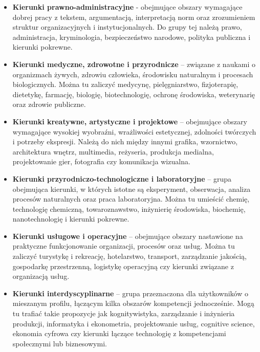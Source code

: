 \documentclass[12pt,a4paper,oneside]{article}
\begin{document}
\begin{itemize}[leftmargin=1.2cm]
    \item \textbf{Kierunki prawno-administracyjne} - obejmujące obszary wymagające dobrej pracy z tekstem, argumentacją, interpretacją norm oraz zrozumieniem struktur organizacyjnych i instytucjonalnych. Do grupy tej należą prawo, administracja, kryminologia, bezpieczeństwo narodowe, polityka publiczna i kierunki pokrewne.

    \item \textbf{Kierunki medyczne, zdrowotne i przyrodnicze} – związane z naukami o organizmach żywych, zdrowiu człowieka, środowisku naturalnym i procesach biologicznych. Można tu zaliczyć medycynę, pielęgniarstwo, fizjoterapię, dietetykę, farmację, biologię, biotechnologię, ochronę środowiska, weterynarię oraz zdrowie publiczne.

    \item \textbf{Kierunki kreatywne, artystyczne i projektowe} – obejmujące obszary wymagające wysokiej wyobraźni, wrażliwości estetycznej, zdolności twórczych i potrzeby ekspresji. Należą do nich między innymi grafika, wzornictwo, architektura wnętrz, multimedia, reżyseria, produkcja medialna, projektowanie gier, fotografia czy komunikacja wizualna.

    \item \textbf{Kierunki przyrodniczo-technologiczne i laboratoryjne} – grupa obejmująca kierunki, w których istotne są eksperyment, obserwacja, analiza procesów naturalnych oraz praca laboratoryjna. Można tu umieścić chemię, technologię chemiczną, towaroznawstwo, inżynierię środowiska, biochemię, nanotechnologię i kierunki pokrewne.

    \item \textbf{Kierunki usługowe i operacyjne} – obejmujące obszary nastawione na praktyczne funkcjonowanie organizacji, procesów oraz usług. Można tu zaliczyć turystykę i rekreację, hotelarstwo, transport, zarządzanie jakością, gospodarkę przestrzenną, logistykę operacyjną czy kierunki związane z organizacją usług.

    \item \textbf{Kierunki interdyscyplinarne} – grupa przeznaczona dla użytkowników o mieszanym profilu, łączącym kilka obszarów kompetencji jednocześnie. Mogą tu trafiać takie propozycje jak kognitywistyka, zarządzanie i inżynieria produkcji, informatyka i ekonometria, projektowanie usług, cognitive science, ekonomia cyfrowa czy kierunki łączące technologię z kompetencjami społecznymi lub biznesowymi.
\end{itemize}
\end{document}
